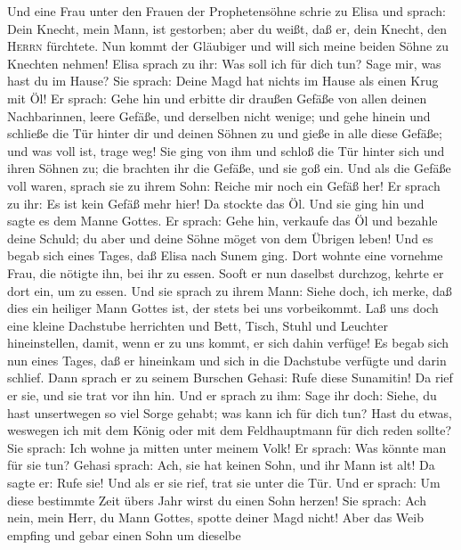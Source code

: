  Und eine Frau unter den Frauen der Prophetensöhne schrie
zu Elisa und sprach: Dein Knecht, mein Mann, ist gestorben; aber du
weißt, daß er, dein Knecht, den \textsc{Herrn} fürchtete. Nun kommt der
Gläubiger und will sich meine beiden Söhne zu Knechten nehmen!
 Elisa sprach zu ihr: Was soll ich für dich tun? Sage mir,
was hast du im Hause? Sie sprach: Deine Magd hat nichts im Hause als
einen Krug mit Öl!  Er sprach: Gehe hin und erbitte dir
draußen Gefäße von allen deinen Nachbarinnen, leere Gefäße, und
derselben nicht wenige;  und gehe hinein und schließe die
Tür hinter dir und deinen Söhnen zu und gieße in alle diese Gefäße; und
was voll ist, trage weg!  Sie ging von ihm und schloß die
Tür hinter sich und ihren Söhnen zu; die brachten ihr die Gefäße, und
sie goß ein.  Und als die Gefäße voll waren, sprach sie zu
ihrem Sohn: Reiche mir noch ein Gefäß her! Er sprach zu ihr: Es ist kein
Gefäß mehr hier! Da stockte das Öl.  Und sie ging hin und
sagte es dem Manne Gottes. Er sprach: Gehe hin, verkaufe das Öl und
bezahle deine Schuld; du aber und deine Söhne möget von dem Übrigen
leben!  Und es begab sich eines Tages, daß Elisa nach
Sunem ging. Dort wohnte eine vornehme Frau, die nötigte ihn, bei ihr zu
essen. Sooft er nun daselbst durchzog, kehrte er dort ein, um zu essen.
 Und sie sprach zu ihrem Mann: Siehe doch, ich merke, daß
dies ein heiliger Mann Gottes ist, der stets bei uns vorbeikommt.
 Laß uns doch eine kleine Dachstube herrichten und Bett,
Tisch, Stuhl und Leuchter hineinstellen, damit, wenn er zu uns kommt, er
sich dahin verfüge!  Es begab sich nun eines Tages, daß
er hineinkam und sich in die Dachstube verfügte und darin schlief.
 Dann sprach er zu seinem Burschen Gehasi: Rufe diese
Sunamitin! Da rief er sie, und sie trat vor ihn hin.  Und
er sprach zu ihm: Sage ihr doch: Siehe, du hast unsertwegen so viel
Sorge gehabt; was kann ich für dich tun? Hast du etwas, weswegen ich mit
dem König oder mit dem Feldhauptmann für dich reden sollte? Sie sprach:
Ich wohne ja mitten unter meinem Volk!  Er sprach: Was
könnte man für sie tun? Gehasi sprach: Ach, sie hat keinen Sohn, und ihr
Mann ist alt!  Da sagte er: Rufe sie! Und als er sie
rief, trat sie unter die Tür.  Und er sprach: Um diese
bestimmte Zeit übers Jahr wirst du einen Sohn herzen! Sie sprach: Ach
nein, mein Herr, du Mann Gottes, spotte deiner Magd nicht!
 Aber das Weib empfing und gebar einen Sohn um dieselbe
